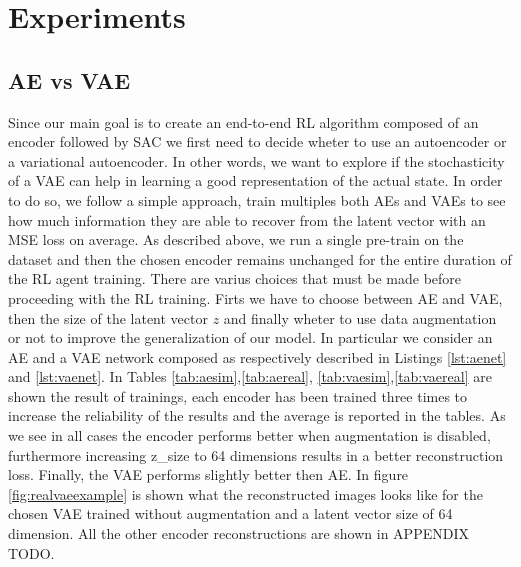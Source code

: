 \chapter{Experiments}

\section{AE vs VAE}

Since our main goal is to create an end-to-end RL algorithm composed of an encoder followed by SAC we first need to decide wheter to use an autoencoder or a variational autoencoder. In other words, we want to explore if the stochasticity of a VAE can help in learning a good representation of the actual state. In order to do so, we follow a simple approach, train multiples both AEs and VAEs to see how much information they are able to recover from the latent vector with an MSE loss on average. As described above, we run a single pre-train on the dataset and then the chosen encoder remains unchanged for the entire duration of the RL agent training. There are varius choices that must be made before proceeding with the RL training. Firts we have to choose between AE and VAE, then the size of the latent vector $z$ and finally wheter to use data augmentation or not to improve the generalization of our model. In particular we consider an AE and a VAE network composed as respectively described in Listings \ref{lst:aenet} and \ref{lst:vaenet}. In Tables \ref{tab:aesim},\ref{tab:aereal}, \ref{tab:vaesim},\ref{tab:vaereal} are shown the result of trainings, each encoder has been trained three times to increase the reliability of the results and the average is reported in the tables. As we see in all cases the encoder performs better when augmentation is disabled, furthermore increasing z\_size to 64 dimensions results in a better reconstruction loss. Finally, the VAE performs slightly better then AE. In figure \ref{fig:realvaeexample} is shown what the reconstructed images looks like for the chosen VAE trained without augmentation and a latent vector size of 64 dimension. All the other encoder reconstructions are shown in APPENDIX TODO.

